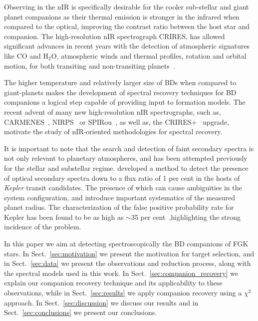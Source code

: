 \documentclass[fleqn,usenatbib]{mnras}
\newcommand*\bl{\color{blue}}
\begin{document}
    Observing in the nIR is specifically desirable for the cooler sub-stellar and giant planet companions as their thermal emission is stronger in the infrared {\bl when compared to the optical, improving the contrast ratio between the host star and companion. The high-resolution nIR spectrograph CRIRES, has allowed significant advances in recent years with the detection of atmospheric signatures like \(\textrm{CO}\) and \(\textrm{H}_{2}\textrm{O}\), atmospheric winds and thermal profiles, rotation and orbital motion, for both transiting and non-transiting planets~\citep[e.g.][]{snellen_orbital_2010, snellen_fast_2014, brogi_signature_2012, brogi_carbon_2014, brogi_rotation_2016, rodler_weighing_2012, dekok_detection_2013, piskorz_evidence_2016,  birkby_discovery_2017}.}
    
    The higher temperature and relatively larger size of BDs when compared to giant-planets makes the development of spectral recovery techniques for BD companions a logical step capable of providing input to formation models. {\bl The recent advent of many new high-resolution nIR spectrographs, such as, {CARMENES}~\citep{quirrenbach_carmenes_2014}, NIRPS~\citep{bouchy_nearinfrared_2017} or SPIRou~\citep{artigau_spirou_2014}, as well as, the CRIRES+~\citep{dorn_crires_2016} upgrade, motivate the study of nIR-oriented methodologies for spectral recovery.}
    
    {\bl It is important to note that the search and detection of faint secondary spectra is not only relevant to planetary atmospheres, and has been attempted previously for the stellar and substellar regime.} \citet{kolbl_detection_2015} developed a method to detect the presence of optical secondary spectra down to a flux ratio of 1 per cent in the hosts of \emph{Kepler} transit candidates. The presence of which can cause ambiguities in the system configuration, {\bl and introduce important systematics of the measured planet radius.} The characterization of the false positive probability rate for Kepler has been found to be as high as \(\sim\)35 per cent~\citet{santerne_sophie_2012},{\bl highlighting the strong incidence of the problem.}
    
    {\bl In this paper we aim at detecting spectroscopically the BD companions of FGK stars. In Sect.~\ref{sec:motivation} we present the motivation for target selection, and in Sect.~\ref{sec:data} we present the observations and reduction process, along with the spectral models used in this work. In Sect.~\ref{sec:companion_recovery} we explain our companion recovery technique and its applicability to these observations,} while in Sect.~\ref{sec:results} we apply companion recovery using a \(\chi^{2}\) approach. In Sect.~\ref{sec:discussion} we discuss our results and in Sect.~\ref{sec:conclusions} we present our conclusions.
       
\end{document}
